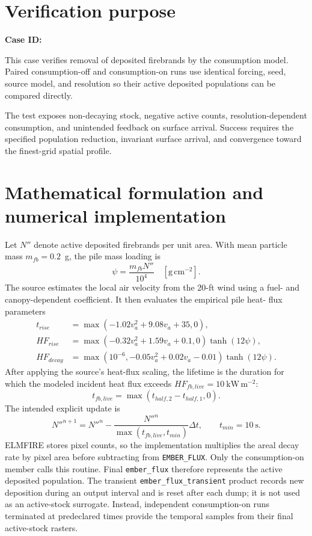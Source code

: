 \section{Verification purpose}

\textbf{Case ID:} \CaseID

This case verifies removal of deposited firebrands by the consumption model. Paired consumption-off and consumption-on runs use identical forcing, seed, source model, and resolution so their active deposited populations can be compared directly.

The test exposes non-decaying stock, negative active counts, resolution-dependent consumption, and unintended feedback on surface arrival. Success requires the specified population reduction, invariant surface arrival, and convergence toward the finest-grid spatial profile.

\section{Mathematical formulation and numerical implementation}
Let \(N''\) denote active deposited firebrands per unit area. With mean particle
mass \(m_{fb}=0.2\)~g, the pile mass loading is
\begin{equation}
 \psi=\frac{m_{fb}N''}{10^4}\quad[\mathrm{g\,cm^{-2}}].
\end{equation}
The source estimates the local air velocity from the 20-ft wind using a fuel-
and canopy-dependent coefficient. It then evaluates the empirical pile heat-
flux parameters
\begin{align}
 t_{rise}&=\max(-1.02v_a^2+9.08v_a+35,0),\\
 HF_{rise}&=\max(-0.32v_a^2+1.59v_a+0.1,0)\tanh(12\psi),\\
 HF_{decay}&=\max(10^{-6},-0.05v_a^2+0.02v_a-0.01)\tanh(12\psi).
\end{align}
After applying the source's heat-flux scaling, the lifetime is the duration for
which the modeled incident heat flux exceeds
\(HF_{fb,live}=10~\mathrm{kW\,m^{-2}}\):
\begin{equation}
 t_{fb,live}=\max(t_{half,2}-t_{half,1},0).
\end{equation}
The intended explicit update is
\begin{equation}
 N''^{n+1}=N''^n-\frac{N''^n}{\max(t_{fb,live},t_{min})}\Delta t,
 \qquad t_{min}=10~\mathrm{s}.
 \label{eq:decay}
\end{equation}
ELMFIRE stores pixel counts, so the implementation multiplies the areal decay
rate by pixel area before subtracting from \texttt{EMBER\_FLUX}. Only the
consumption-on member calls this routine. Final \texttt{ember\_flux} therefore
represents the active deposited population. The transient
\texttt{ember\_flux\_transient} product records new deposition during an
output interval and is reset after each dump; it is not used as an active-stock
surrogate. Instead, independent consumption-on runs terminated at predeclared
times provide the temporal samples from their final active-stock rasters.

